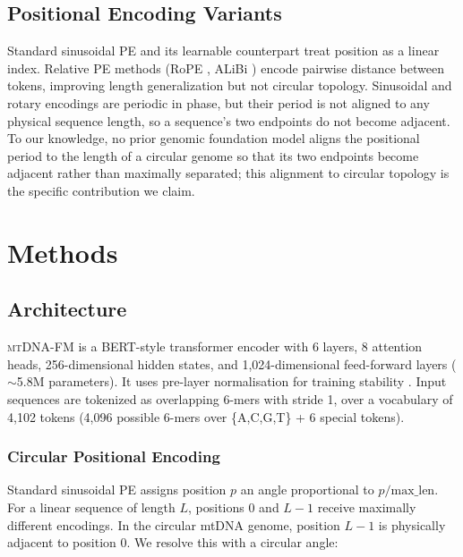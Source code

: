 \documentclass[10pt]{article}
\newcommand{\mtdnafm}{\textsc{mtDNA-FM}\xspace}
\begin{document}
\subsection{Positional Encoding Variants}

Standard sinusoidal PE \citep{vaswani2017attention} and its learnable counterpart treat position
as a linear index. Relative PE methods (RoPE \citep{su2021rope}, ALiBi \citep{press2022alibi})
encode pairwise distance between tokens, improving length generalization but not circular
topology. Sinusoidal and rotary encodings are periodic in phase, but their period is not aligned
to any physical sequence length, so a sequence's two endpoints do not become adjacent. To our
knowledge, no prior genomic foundation model aligns the positional period to the length of a
circular genome so that its two endpoints become adjacent rather than maximally separated; this
alignment to circular topology is the specific contribution we claim.

\section{Methods}

\subsection{Architecture}
\label{sec:architecture}

\mtdnafm is a BERT-style \citep{devlin2018bert} transformer encoder with 6 layers, 8 attention
heads, 256-dimensional hidden states, and 1,024-dimensional feed-forward layers
($\sim$5.8M parameters). It uses pre-layer normalisation for training stability
\citep{xiong2020layer}. Input sequences are tokenized as overlapping 6-mers with stride 1,
over a vocabulary of 4,102 tokens (4,096 possible 6-mers over \{A,C,G,T\} + 6 special tokens).

\subsubsection{Circular Positional Encoding}
\label{sec:circular_pe}

Standard sinusoidal PE assigns position $p$ an angle proportional to $p/\text{max\_len}$.
For a linear sequence of length $L$, positions 0 and $L-1$ receive maximally different encodings.
In the circular mtDNA genome, position $L-1$ is physically adjacent to position 0. We resolve
this with a circular angle:
\end{document}
